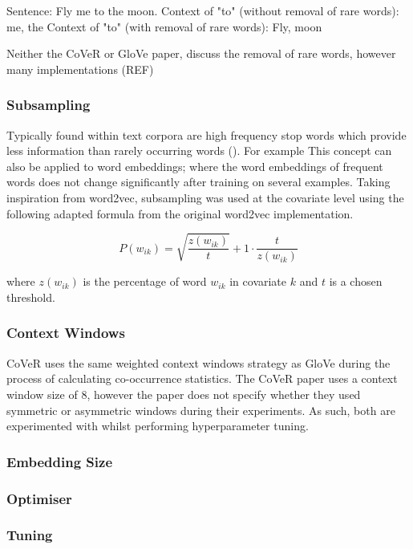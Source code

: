 \noindent
\newline
Sentence: Fly me to the moon.
\noindent
\newline
Context of "to" (without removal of rare words): me, the
\noindent
\newline
Context of "to" (with removal of rare words): Fly, moon

\noindent
\newline
Neither the CoVeR or GloVe paper, discuss the removal of rare words, however many implementations (REF) 
\subsubsection{Subsampling}
Typically found within text corpora are high frequency stop words which provide less information than rarely occurring words (\cite{Mikolov2013a}). For example This concept can also be applied to word embeddings; where the word embeddings of frequent words does not change significantly after training on several examples. Taking inspiration from word2vec, subsampling was used at the covariate level using the following adapted formula from the original word2vec implementation.

\begin{equation}
P(w_{ik}) = \sqrt{\dfrac{z(w_{ik})}{t}} + 1 \cdot \dfrac{t}{z(w_{ik})}
\end{equation}

\noindent
\newline
where \(z(w_{ik})\) is the percentage of word \(w_{ik}\) in covariate \(k\) and \(t\) is a chosen threshold.
\subsubsection{Context Windows}
CoVeR uses the same weighted context windows strategy as GloVe during the process of calculating co-occurrence statistics. The CoVeR paper uses a context window size of 8, however the paper does not specify whether they used symmetric or asymmetric windows during their experiments. As such, both are experimented with whilst performing hyperparameter tuning.  
\subsubsection{Embedding Size}
\subsubsection{Optimiser}
\subsubsection{Tuning}
